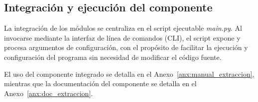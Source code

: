 \subsection{Integración y ejecución del componente}
La integración de los módulos se centraliza en el script ejecutable \textit{main.py}. Al invocarse 
mediante la interfaz de línea de comandos (CLI), el script expone y procesa argumentos 
de configuración, con el propósito de facilitar la ejecución y configuración del programa sin necesidad
de modificar el código fuente.
\medskip

El uso del componente integrado se detalla en el Anexo~\ref{anx:manual_extraccion}, mientras que la documentación
del componente se detalla en el Anexo~\ref{anx:doc_extraccion}.